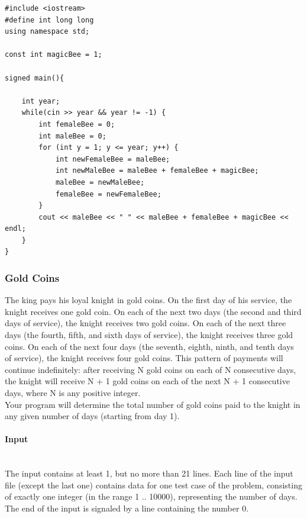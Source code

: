 \documentclass{article}
\begin{document}
\begin{lstlisting}
#include <iostream>
#define int long long
using namespace std;

const int magicBee = 1;

signed main(){

	int year;
	while(cin >> year && year != -1) {
		int femaleBee = 0;
		int maleBee = 0;
		for (int y = 1; y <= year; y++) {
			int newFemaleBee = maleBee;
			int newMaleBee = maleBee + femaleBee + magicBee;
			maleBee = newMaleBee;
			femaleBee = newFemaleBee;
		}
		cout << maleBee << " " << maleBee + femaleBee + magicBee << endl;
	}   
}
\end{lstlisting}


\subsubsection{Gold Coins}

The king pays his loyal knight in gold coins. On the first day of his service, the knight receives one
gold coin. On each of the next two days (the second and third days of service), the knight receives
two gold coins. On each of the next three days (the fourth, fifth, and sixth days of service), the
knight receives three gold coins. On each of the next four days (the seventh, eighth, ninth, and
tenth days of service), the knight receives four gold coins. This pattern of payments will continue
indefinitely: after receiving N gold coins on each of N consecutive days, the knight will receive
N + 1 gold coins on each of the next N + 1 consecutive days, where N is any positive integer.
\\Your program will determine the total number of gold coins paid to the knight in any given
number of days (starting from day 1).

\paragraph{Input} \mbox{} \\

The input contains at least 1, but no more than 21 lines. Each line of the input file (except the last
one) contains data for one test case of the problem, consisting of exactly one integer (in the range
1 .. 10000), representing the number of days. The end of the input is signaled by a line containing the
number 0.
\end{document}
